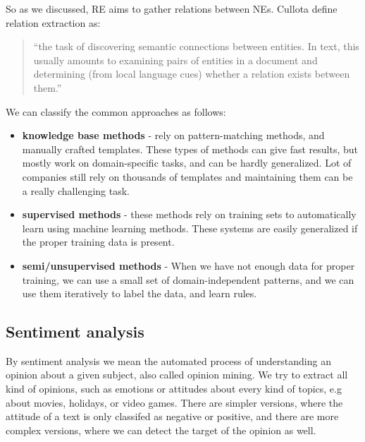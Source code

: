 So as we discussed, RE aims to gather relations between NEs. Cullota \cite{Cullota06} define relation extraction as:
\begin{quotation}
	“the task of discovering semantic connections between entities. In text,
this usually amounts to examining pairs of entities in a document and
determining (from local language cues) whether a relation exists between
them.”
\end{quotation}
We can classify the common approaches as follows:

\begin{itemize}
	\item \textbf{knowledge base methods} - rely on pattern-matching methods, and manually crafted templates. These types of methods can give fast results, but mostly work on domain-specific tasks, and can be hardly generalized. Lot of companies still rely on thousands of templates and maintaining them can be a really challenging task. 
	\item \textbf{supervised methods} - these methods rely on training sets to automatically learn using machine learning methods. These systems are easily generalized if the proper training data is present.
	\item \textbf{semi/unsupervised methods} - When we have not enough data for proper training, we can use a small set of domain-independent patterns, and we can use them iteratively to label the data, and learn rules.
\end{itemize}

\subsection{Sentiment analysis}

By sentiment analysis we mean the automated process of understanding an opinion about a given subject, also called opinion mining. We try to extract all kind of opinions, such as emotions or attitudes about every kind of topics, e.g about movies, holidays, or video games. There are simpler versions, where the attitude of a text is only classifed as negative or positive, and there are more complex versions, where we can detect the target of the opinion as well.

